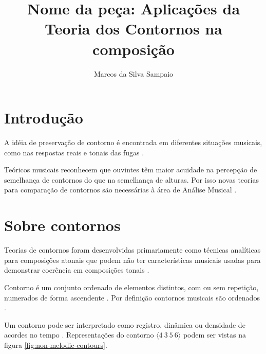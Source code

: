 \documentclass[12pt,brazil]{book}
\title{Nome da peça: Aplicações da Teoria dos Contornos na composição}
\author{Marcos da Silva Sampaio}
\newcommand{\contorno}[1]{$\langle #1 \rangle$}
\begin{document}
\maketitle
\tableofcontents
\listoftables
\listoffigures

\chapter{Introdução}
\label{cha:introducao}

A idéia de preservação de contorno é encontrada em diferentes
situações musicais, como nas respostas reais e tonais das fugas
\cite[p. 29]{morris87:composition}.

Teóricos musicais reconhecem que ouvintes têm maior acuidade na
percepção de semelhança de contornos do que na semelhança de
alturas. Por isso novas teorias para comparação de contornos são
necessárias à área de Análise Musical
\cite[p. 226]{marvin.ea87:relating}.

\chapter{Sobre contornos}
\label{cha:sobre-contornos}



Teorias de contornos foram desenvolvidas primariamente como técnicas
analíticas para composições atonais que podem não ter características
musicais usadas para demonstrar coerência em composições tonais
\cite[p. 1]{beard03:contour}.

Contorno é um conjunto ordenado de elementos distintos, com ou sem
repetição, numerados de forma ascendente
\cite[p. 206]{morris93:directions}. Por definição contornos musicais
são ordenados \cite[p. 228]{marvin.ea87:relating}.

Um contorno pode ser interpretado como registro, dinâmica ou densidade
de acordes no tempo \cite[p. 206]{morris93:directions}
\cite[p. 22]{clifford95:contour}. Representações do contorno
\contorno{4\:3\:5\:6} podem ser vistas na figura
\ref{fig:non-melodic-contours}.
\end{document}
